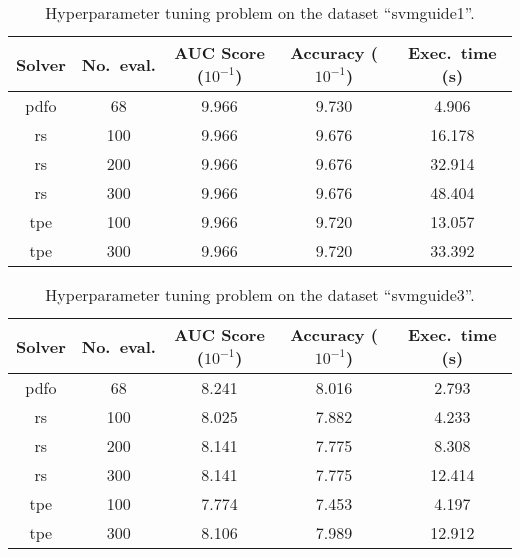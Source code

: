 \documentclass[11pt,draft]{article}
\numberwithin{equation}{section}
\begin{document}
\begin{table}[!ht]
    \caption{Hyperparameter tuning problem on the dataset \enquote{svmguide1}.}
    \centering
    \begin{tabular}{cS[table-format=3]SSS}
        \toprule
        Solver      & {No.\ eval.}  & {AUC Score ($10^{-1}$)}   & {Accuracy ($10^{-1}$)}    & {Exec.\ time (\si{\second})}\\
        \midrule
        \gls{pdfo}  & 68            & 9.966                     & 9.730                     & 4.906\\
        \gls{rs}    & 100           & 9.966                     & 9.676                     & 16.178\\
        \gls{rs}    & 200           & 9.966                     & 9.676                     & 32.914\\
        \gls{rs}    & 300           & 9.966                     & 9.676                     & 48.404\\
        \gls{tpe}   & 100           & 9.966                     & 9.720                     & 13.057\\
        \gls{tpe}   & 300           & 9.966                     & 9.720                     & 33.392\\
        \bottomrule
    \end{tabular}
\end{table}

\begin{table}[!ht]
    \caption{Hyperparameter tuning problem on the dataset \enquote{svmguide3}.}
    \centering
    \begin{tabular}{cS[table-format=3]SSS}
        \toprule
        Solver      & {No.\ eval.}  & {AUC Score ($10^{-1}$)}   & {Accuracy ($10^{-1}$)}    & {Exec.\ time (\si{\second})}\\
        \midrule
        \gls{pdfo}  & 68            & 8.241                     & 8.016                     & 2.793\\
        \gls{rs}    & 100           & 8.025                     & 7.882                     & 4.233\\
        \gls{rs}    & 200           & 8.141                     & 7.775                     & 8.308\\
        \gls{rs}    & 300           & 8.141                     & 7.775                     & 12.414\\
        \gls{tpe}   & 100           & 7.774                     & 7.453                     & 4.197\\
        \gls{tpe}   & 300           & 8.106                     & 7.989                     & 12.912\\
        \bottomrule
    \end{tabular}
\end{table}
\end{document}
